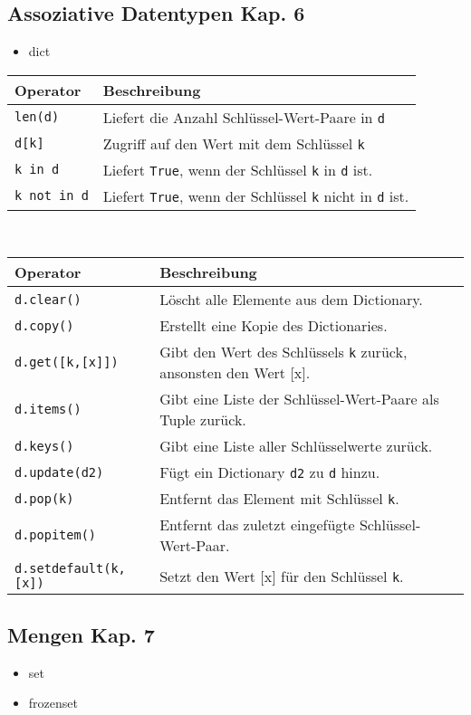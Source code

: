 \subsection[Assoziative Datentypen]{Assoziative Datentypen \tiny{Kap. 6}}
\begin{itemize}
	\item dict
\end{itemize}
\begin{tabular}{|l|l|}
	\hline 
	\textbf{Operator} &\textbf{Beschreibung}\\ 
	\hline 
	\texttt{len(d)} &Liefert die Anzahl Schlüssel-Wert-Paare in \texttt{d}\\
	\texttt{d[k]} &Zugriff auf den Wert mit dem Schlüssel \texttt{k}\\
	\texttt{k in d} &Liefert \texttt{True}, wenn der Schlüssel \texttt{k} in \texttt{d} ist.\\
	\texttt{k not in d} &Liefert \texttt{True}, wenn der Schlüssel \texttt{k} nicht in \texttt{d} ist.\\
	\hline 
\end{tabular}\\
\begin{tabular}{|l|l|}
	\hline 
	\textbf{Operator} &\textbf{Beschreibung}\\ 
	\hline 
	\texttt{d.clear()} &Löscht alle Elemente aus dem Dictionary.\\
	\texttt{d.copy()} &Erstellt eine Kopie des Dictionaries.\\
	\texttt{d.get([k,[x]])} &Gibt den Wert des Schlüssels \texttt{k} zurück, ansonsten den Wert [x].\\
	\texttt{d.items()} &Gibt eine Liste der Schlüssel-Wert-Paare als Tuple zurück.\\
	\texttt{d.keys()} &Gibt eine Liste aller Schlüsselwerte zurück.\\
	\texttt{d.update(d2)} &Fügt ein Dictionary \texttt{d2} zu \texttt{d} hinzu.\\
	\texttt{d.pop(k)} &Entfernt das Element mit Schlüssel \texttt{k}.\\
	\texttt{d.popitem()} &Entfernt das zuletzt eingefügte Schlüssel-Wert-Paar.\\
	\texttt{d.setdefault(k,[x])} &Setzt den Wert [x] für den Schlüssel \texttt{k}.\\
	\hline 
\end{tabular}

\subsection[Mengen]{Mengen \tiny{Kap. 7}}
\begin{itemize}
	\item set
	\item frozenset
\end{itemize}

